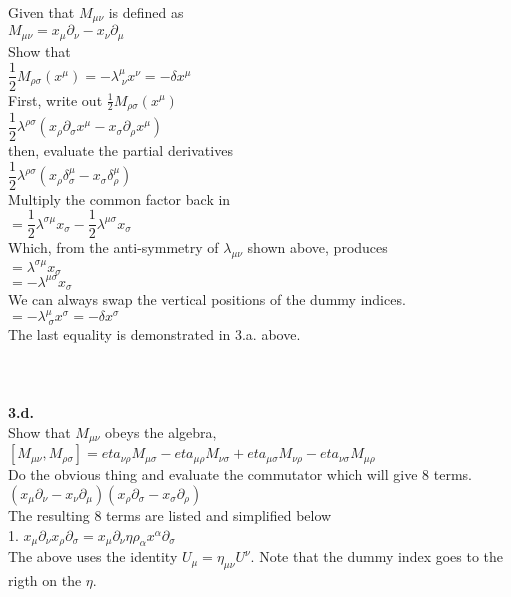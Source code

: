 \documentclass[prb,preprint]
{revtex4-1}
\newcommand{\PRLsep}{\noindent\makebox[\linewidth]{\resizebox{0.8888\linewidth}{2pt}{$\bullet$}}\bigskip}
\begin{document}
Given that $M_{\mu\nu}$ is defined as 
\\
$M_{\mu\nu} = x_\mu\partial_\nu - x_\nu\partial_\mu$
\\
Show that 
\\
$\dfrac{1}{2} M_{\rho\sigma}\left(x^\mu\right) = -\lambda^\mu_{\;\nu} x^\nu = -\delta x^\mu$
\\
First, write out $\frac{1}{2}M_{\rho\sigma}\left(x^\mu\right)$
\\
$\dfrac{1}{2}\lambda^{\rho\sigma}\left(x_\rho \partial_\sigma x^\mu - x_\sigma \partial_\rho x^\mu\right)$
\\
then, evaluate the partial derivatives
\\
$\dfrac{1}{2}\lambda^{\rho\sigma}\left(x_\rho \delta^\mu_\sigma - x_\sigma \delta^\mu_\rho\right)$
\\
Multiply the common factor back in
\\
$= \dfrac{1}{2}\lambda^{\sigma\mu}x_\sigma - \dfrac{1}{2}\lambda^{\mu\sigma}x_\sigma$
\\
Which, from the anti-symmetry of $\lambda_{\mu\nu}$ shown above, produces
\\
$=\lambda^{\sigma\mu} x_\sigma$
\\
$=-\lambda^{\mu\sigma} x_\sigma$
\\
We can always swap the vertical positions of the dummy indices.
\\
$=-\lambda^\mu_{\;\sigma} x^\sigma = -\delta x^\sigma$
\\
The last equality is demonstrated in 3.a. above.
\\
\\
\PRLsep
\\
\\
\newpage
\textbf{3.d.}
\\
Show that $M_{\mu\nu}$ obeys the algebra, 
$\left[M_{\mu\nu}, M_{\rho\sigma}\right] = eta_{\nu\rho}M_{\mu\sigma} - eta_{\mu\rho}M_{\nu\sigma} + eta_{\mu\sigma}M_{\nu\rho} - eta_{\nu\sigma}M_{\mu\rho}$
\\
Do the obvious thing and evaluate the commutator which will give 8 terms.
\\
$\left(x_\mu \partial_\nu - x_\nu \partial_\mu\right)\left(x_\rho \partial_\sigma - x_\sigma \partial_\rho\right)$
\\
The resulting 8 terms are listed and simplified below
\\
1.  $x_\mu \partial_\nu x_\rho \partial_\sigma = x_\mu\partial_\nu\eta{\rho_\alpha}x^\alpha \partial_\sigma$
\\
The above uses the identity $U_\mu = \eta_{\mu\nu}U^\nu$.  Note that the dummy index goes to the rigth on the $\eta$.
\end{document}
